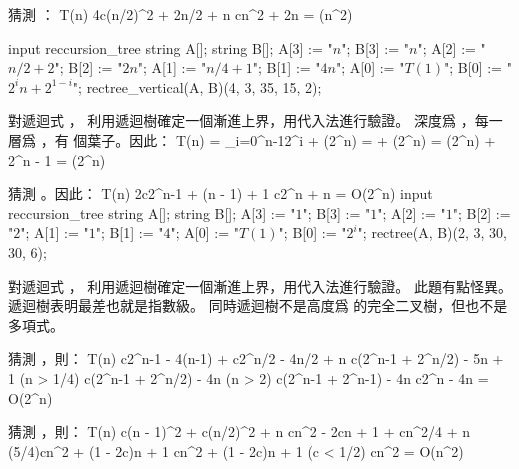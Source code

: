 猜測 ：
\startformula\startmathalignment
\NC T(n) \NC \le 4c(n/2)^2 + 2n/2 + n \NR
\NC      \NC \le cn^2 + 2n \NR
\NC      \NC = \Theta(n^2) \NR
\stopmathalignment\stopformula

	\startMPcode
		input reccursion_tree
		string A[];
		string B[];
		A[3] := "$n$";		B[3] := "$n$";
		A[2] := "$n/2+2$";	B[2] := "$2n$";
		A[1] := "$n/4 + 1$";	B[1] := "$4n$";
		A[0] := "$T(1)$";	B[0] := "$2^i n + 2^{1-i}$";
		rectree_vertical(A, B)(4, 3, 35, 15, 2);
	\stopMPcode
\stopANSWER

\startEXERCISE
對遞迴式 ，
利用遞迴樹確定一個漸進上界，用代入法進行驗證。
\stopEXERCISE
\startANSWER
深度爲 ，每一層爲 ，有  個葉子。因此：
\startformula\startmathalignment
\NC T(n) \NC = \sum_{i=0}^{n-1}2^i + \Theta(2^n) \NR
\NC      \NC =  + \Theta(2^n) \NR
\NC      \NC = \Theta(2^n) + 2^n - 1 \NR
\NC      \NC = \Theta(2^n) \NR
\stopmathalignment\stopformula

猜測 。因此：
\startformula\startmathalignment
\NC T(n) \NC \le 2c2^{n-1} + (n - 1) + 1 \NR
\NC      \NC \le c2^n + n \NR
\NC      \NC = O(2^n) \NR
\stopmathalignment\stopformula
	\startMPcode
		input reccursion_tree
		string A[];
		string B[];
		A[3] := "$1$";		B[3] := "$1$";
		A[2] := "$1$";		B[2] := "$2$";
		A[1] := "$1$";		B[1] := "$4$";
		A[0] := "$T(1)$";	B[0] := "$2^i$";
		rectree(A, B)(2, 3, 30, 30, 6);
	\stopMPcode
\stopANSWER

\startEXERCISE
對遞迴式 ，
利用遞迴樹確定一個漸進上界，用代入法進行驗證。
\stopEXERCISE
\startANSWER
此題有點怪異。遞迴樹表明最差也就是指數級。
同時遞迴樹不是高度爲  的完全二叉樹，但也不是多項式。

猜測 ，則：
\startformula\startmathalignment[n=3]
\NC T(n) \NC \le c2^{n-1} - 4(n-1) + c2^{n/2} - 4n/2 + n \NC \NR
\NC      \NC \le c(2^{n-1} + 2^{n/2}) - 5n + 1 \NC (n > 1/4) \NR
\NC      \NC \le c(2^{n-1} + 2^{n/2}) - 4n \NC (n > 2)\NR
\NC      \NC \le c(2^{n-1} + 2^{n-1}) - 4n \NC \NR
\NC      \NC \le c2^n - 4n \NC \NR
\NC      \NC = O(2^n) \NC \NR
\stopmathalignment\stopformula

猜測 ，則：
\startformula\startmathalignment[n=3]
\NC T(n) \NC \ge c(n - 1)^2 + c(n/2)^2 + n \NC\NR
\NC      \NC \ge cn^2 - 2cn + 1 + cn^2/4 + n \NC\NR
\NC      \NC \ge (5/4)cn^2 + (1 - 2c)n + 1 \NC\NR
\NC      \NC \ge cn^2 + (1 - 2c)n + 1 \NC (c < 1/2)\NR
\NC      \NC \ge cn^2 \NC\NR
\NC      \NC = O(n^2) \NC\NR
\stopmathalignment\stopformula
\stopANSWER

